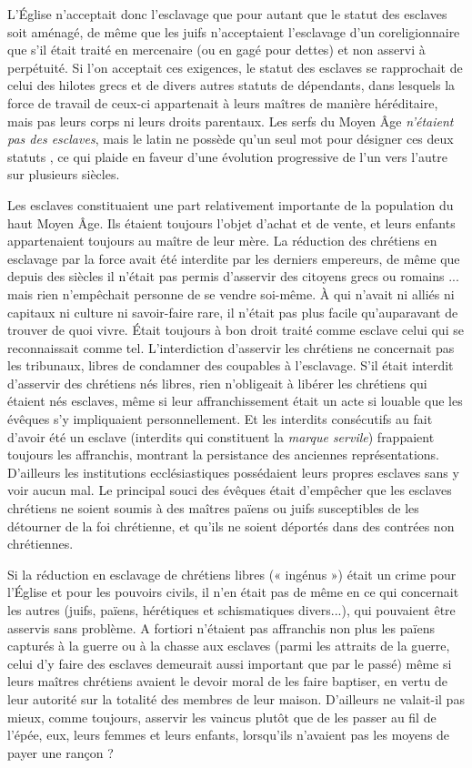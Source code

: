  L'Église n'acceptait donc l'esclavage que pour autant que le statut des esclaves soit aménagé, de même que les juifs n'acceptaient l'esclavage d'un coreligionnaire que s'il était traité en mercenaire (ou en gagé pour dettes) et non asservi à perpétuité. Si l'on acceptait ces exigences, le statut des esclaves se rapprochait de celui des hilotes grecs et de divers autres statuts de dépendants, dans lesquels la force de travail de ceux-ci appartenait à leurs maîtres de manière héréditaire, mais pas leurs corps ni leurs droits parentaux. Les serfs du Moyen Âge \emph{n'étaient pas des esclaves}, mais le latin ne possède qu'un seul mot pour désigner ces deux statuts , ce qui plaide en faveur d'une évolution progressive de l'un vers l'autre sur plusieurs siècles.

 Les esclaves constituaient une part relativement importante de la population du haut Moyen Âge. Ils étaient toujours l'objet d'achat et de vente, et leurs enfants appartenaient toujours au maître de leur mère. La réduction des chrétiens en esclavage par la force avait été interdite par les derniers empereurs, de même que depuis des siècles il n'était pas permis d'asservir des citoyens grecs ou romains ... mais rien n'empêchait personne de se vendre soi-même. À qui n'avait ni alliés ni capitaux ni culture ni savoir-faire rare, il n'était pas plus facile qu'auparavant de trouver de quoi vivre. Était toujours à bon droit traité comme esclave celui qui se reconnaissait comme tel. L'interdiction d'asservir les chrétiens ne concernait pas les tribunaux, libres de condamner des coupables à l'esclavage. S'il était interdit d'asservir des chrétiens nés libres, rien n'obligeait à libérer les chrétiens qui étaient nés esclaves, même si leur affranchissement était un acte si louable que les évêques s'y impliquaient personnellement. Et les interdits consécutifs au fait d'avoir été un esclave (interdits qui constituent la \emph{marque servile}) frappaient toujours les affranchis, montrant la persistance des anciennes représentations. D'ailleurs les institutions ecclésiastiques possédaient leurs propres esclaves sans y voir aucun mal. Le principal souci des évêques était d'empêcher que les esclaves chrétiens ne soient soumis à des maîtres païens ou juifs susceptibles de les détourner de la foi chrétienne, et qu'ils ne soient déportés dans des contrées non chrétiennes. 

 Si la réduction en esclavage de chrétiens libres (« ingénus ») était un crime pour l'Église et pour les pouvoirs civils, il n'en était pas de même en ce qui concernait les autres (juifs, païens, hérétiques et schismatiques divers...), qui pouvaient être asservis sans problème. A fortiori n'étaient pas affranchis non plus les païens capturés à la guerre ou à la chasse aux esclaves (parmi les attraits de la guerre, celui d'y faire des esclaves demeurait aussi important que par le passé) même si leurs maîtres chrétiens avaient le devoir moral de les faire baptiser, en vertu de leur autorité sur la totalité des membres de leur maison. D'ailleurs ne valait-il pas mieux, comme toujours, asservir les vaincus plutôt que de les passer au fil de l'épée, eux, leurs femmes et leurs enfants, lorsqu'ils n'avaient pas les moyens de payer une rançon ?

